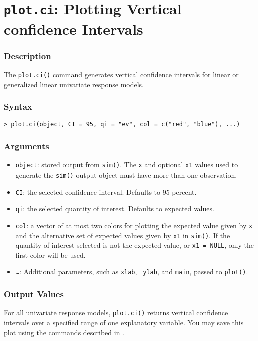 \section{{\tt plot.ci}: Plotting Vertical confidence Intervals}\label{plot.ci}

\subsubsection{Description}
The \texttt{plot.ci()} command generates vertical confidence intervals
for linear or generalized linear univariate response models.  

\subsubsection{Syntax}
\begin{verbatim}
> plot.ci(object, CI = 95, qi = "ev", col = c("red", "blue"), ...) 
\end{verbatim}

\subsubsection{Arguments}
\begin{itemize}
\item {\tt object}: stored output from {\tt sim()}.  The {\tt x} and optional
  {\tt x1} values used to generate the {\tt sim()} output object must
  have more than one observation.  
\item {\tt CI}: the selected confidence interval.  Defaults to 95
  percent.  
\item {\tt qi}: the selected quantity of interest.  Defaults to
  expected values.
\item {\tt col}: a vector of at most two colors for plotting the
  expected value given by {\tt x} and the alternative set of expected
  values given by {\tt x1} in {\tt sim()}.  If the quantity of
  interest selected is not the expected value, or {\tt x1 = NULL},
  only the first color will be used. 
\item {\tt \dots}: Additional parameters, such as {\tt xlab}, {\tt
    ylab}, and {\tt main}, passed to {\tt plot()}.  
\end{itemize}

\subsubsection{Output Values}
For all univariate response models, {\tt plot.ci()} returns vertical
confidence intervals over a specified range of one explanatory
variable.  You may save this plot using the commands described in
.  


